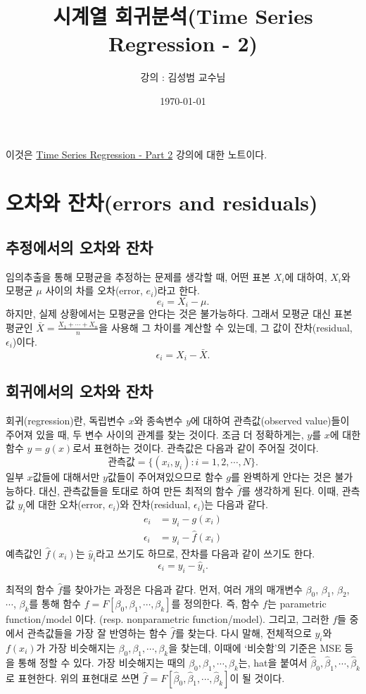 \documentclass{article}
\begin{document}
\title{시계열 회귀분석(Time Series Regression - 2)}
\author{강의 : 김성범 교수님}
\date{\today}
\maketitle

이것은 \href{https://youtu.be/pxG4ZlHJ570}{Time Series Regression - Part 2} 강의에 대한 노트이다.

\section{오차와 잔차(errors and residuals)}
\subsection{추정에서의 오차와 잔차}
임의추출을 통해 모평균을 추정하는 문제를 생각할 때, 어떤 표본 \(X_i\)에 대하여, \(X_i\)와 모평균 \(\mu\) 사이의 차를 오차(error, \(e_i\))라고 한다.
\[e_i = X_i-\mu.\]
하지만, 실제 상황에서는 모평균을 안다는 것은 불가능하다.
그래서 모평균 대신 표본평균인 \(\bar X = \frac{X_1+\cdots+X_n}n\)을 사용해 그 차이를 계산할 수 있는데, 그 값이 잔차(residual, \(\epsilon_i\))이다.
\[\epsilon_i = X_i-\bar X.\]
\subsection{회귀에서의 오차와 잔차}
회귀(regression)란, 독립변수 \(x\)와 종속변수 \(y\)에 대하여 관측값(observed value)들이 주어져 있을 때, 두 변수 사이의 관계를 찾는 것이다.
조금 더 정확하게는, \(y\)를 \(x\)에 대한 함수 \(y=g(x)\)로서 표현하는 것이다.
관측값은 다음과 같이 주어질 것이다.
\[\text{관측값} = \{(x_i,y_i):i=1,2,\cdots,N\}.\]
일부 \(x\)값들에 대해서만 \(y\)값들이 주어져있으므로 함수 \(g\)를 완벽하게 안다는 것은 불가능하다.
대신, 관측값들을 토대로 하여 만든 최적의 함수 \(\hat f\)를 생각하게 된다.
이때, 관측값 \(y_i\)에 대한 오차(error, \(e_i\))와 잔차(residual, \(\epsilon_i\))는 다음과 같다.
\begin{align}
e_i&=y_i-g(x_i)\label{error}\\
\epsilon_i&=y_i-\hat f(x_i)\label{residual}
\end{align}
예측값인 \(\hat f(x_i)\)는 \(\hat y_i\)라고 쓰기도 하므로, 잔차를 다음과 같이 쓰기도 한다.
\[\epsilon_i=y_i-\hat y_i.\]

최적의 함수 \(\hat f\)를 찾아가는 과정은 다음과 같다.
먼저, 여러 개의 매개변수 \(\beta_0\), \(\beta_1\), \(\beta_2\), \(\cdots\), \(\beta_k\)를 통해 함수 \(f=F[\beta_0,\beta_1,\cdots,\beta_k]\)를 정의한다.
즉, 함수 \(f\)는 parametric function/model 이다. (resp. nonparametric function/model).
그리고, 그러한 \(f\)들 중에서 관측값들을 가장 잘 반영하는 함수 \(\hat f\)를 찾는다.
다시 말해, 전체적으로 \(y_i\)와 \(f(x_i)\)가 가장 비슷해지는 \(\beta_0,\beta_1,\cdots,\beta_k\)을 찾는데, 이때에 `비슷함'의 기준은 MSE 등을 통해 정할 수 있다.
가장 비슷해지는 때의 \(\beta_0,\beta_1,\cdots,\beta_k\)는, hat을 붙여서 \(\hat\beta_0,\hat\beta_1,\cdots,\hat\beta_k\)로 표현한다.
위의 표현대로 쓰면 \(\hat f =  F[\hat\beta_0,\hat\beta_1,\cdots,\hat\beta_k]\)이 될 것이다.
\end{document}
